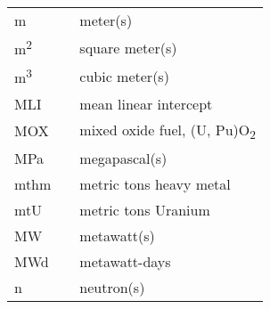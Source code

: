 \begin{ThreePartTable}
\begin{longtable}{l l l}
        m                           &      \hspace{0.25in}     &         meter(s)                                           \\ 
        
        m\textsuperscript{2}        &      \hspace{0.25in}     &         square meter(s)                                    \\ 
        
        m\textsuperscript{3}        &      \hspace{0.25in}     &         cubic meter(s)                                     \\ 
        
        MLI                         &      \hspace{0.25in}     &         mean linear intercept                              \\ 
        
        MOX                         &      \hspace{0.25in}     &         mixed oxide fuel, (U, Pu)O\textsubscript{2}        \\ 
        
        MPa                         &      \hspace{0.25in}     &         megapascal(s)                                      \\ 
        
        mthm                        &      \hspace{0.25in}     &         metric tons heavy metal                            \\ 
        
        mtU                         &      \hspace{0.25in}     &         metric tons Uranium                                \\ 
        
        MW                          &      \hspace{0.25in}     &         metawatt(s)                                        \\ 
        
        MWd                         &      \hspace{0.25in}     &         metawatt-days                                      \\ 
        
        n                           &      \hspace{0.25in}     &         neutron(s)                                         \\ 
        

\end{longtable}
\end{ThreePartTable}
